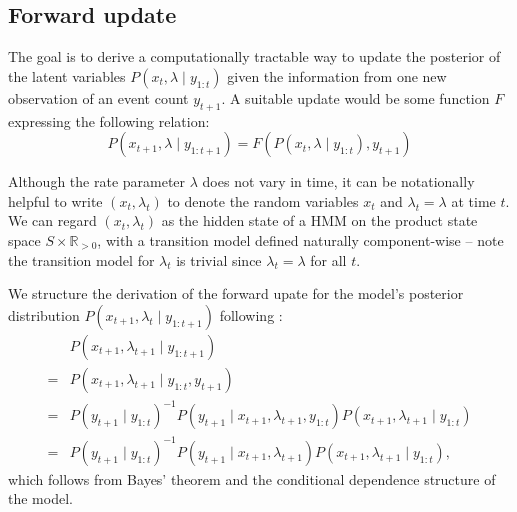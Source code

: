 \documentclass[twoside, 11pt]{article}
\newcommand{\reals}[0] {\mathbb{R}}
\begin{document}
\subsection{Forward update}

The goal is to derive a computationally tractable way to update the posterior of the latent variables $P(x_t, \lambda \mid y_{1:t})$ given the information from one new observation of an event count $y_{t+1}$. A suitable update would be some function $F$ expressing the following relation:
\begin{equation}
P(x_{t+1}, \lambda \mid y_{1:t+1}) = F\left( P(x_t, \lambda \mid y_{1:t}), y_{t+1}\right)
\end{equation}

Although the rate parameter $\lambda$ does not vary in time, it can be notationally helpful to write $(x_t, \lambda_t)$ to denote the random variables $x_t$ and $\lambda_t=\lambda$ at time $t$. We can regard $(x_t, \lambda_t)$ as the hidden state of a HMM on the product state space $S \times \reals_{>0}$, with a transition model defined naturally component-wise -- note the transition model for $\lambda_t$ is trivial since $\lambda_t=\lambda$ for all $t$.

We structure the derivation of the forward upate for the model's posterior distribution $P(x_{t+1}, \lambda_t \mid y_{1:{t+1}})$ following \citet*{russell2002artificial}:
\begin{align}
& P(x_{t+1}, \lambda_{t+1} \mid y_{1:{t+1}}) \nonumber \\
= & P(x_{t+1}, \lambda_{t+1} \mid y_{1:t}, y_{t+1}) \nonumber \\
= & P(y_{t+1} \mid y_{1:t})^{-1} P(y_{t+1} \mid x_{t+1}, \lambda_{t+1}, y_{1:t}) P(x_{t+1}, \lambda_{t+1} \mid y_{1:t}) \nonumber \\
= & P(y_{t+1} \mid y_{1:t})^{-1} P(y_{t+1} \mid x_{t+1}, \lambda_{t+1}) P(x_{t+1}, \lambda_{t+1} \mid y_{1:t}) , \label{eqn:rawforward}
\end{align}
which follows from Bayes' theorem and the conditional dependence structure of the model.
\end{document}
